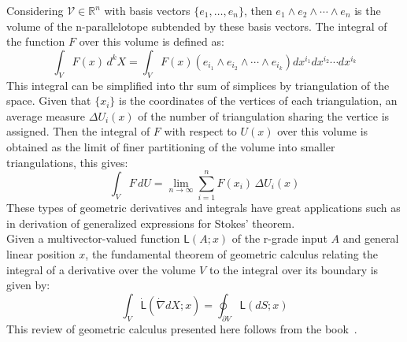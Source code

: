 \documentclass[12pt,onecolumn,letterpaper]{article} %
\begin{document}
Considering $\mathcal{V}\in \mathbb{R}^n$ with basis vectors $\{e_{1},\ldots ,e_{n}\}$, then $e_{1}\wedge e_{2}\wedge \cdots \wedge e_{n}$ is the volume of the n-parallelotope subtended by these basis vectors. The integral of the function $F$ over this volume is defined as:
$$ \int _{V}F(x)\,d^{k}X=\int _{V}F(x)\left(e_{i_{1}}\wedge e_{i_{2}}\wedge \cdots \wedge e_{i_{k}}\right)dx^{i_{1}}dx^{i_{2}}\cdots dx^{i_{k}}$$
This integral can be simplified into thr sum of simplices by triangulation of the space. Given that $\{x_{i}\}$ is the coordinates of the vertices of each triangulation, an average measure $\Delta U_{i}(x)$ of the number of triangulation sharing the vertice is assigned. Then the integral of $F$ with respect to $U(x)$ over this volume is obtained as the limit of finer partitioning of the volume into smaller triangulations, this gives:
$$\int _{V}F\,dU=\lim _{n\rightarrow \infty }\sum _{i=1}^{n}F(x_{i})\,\Delta U_{i}(x)$$
These types of geometric derivatives and integrals have great applications such as in derivation of  generalized expressions for Stokes' theorem.\\
Given a multivector-valued function $\mathsf {L}(A;x)$  of the r-grade input $A$ and general linear position $x$, the fundamental theorem of geometric calculus relating  the integral of a derivative over the volume $V$ to the integral over its boundary is given by:
$$\int _{V}{\dot {\mathsf {L}}}\left({\dot {\nabla }}dX;x\right)=\oint _{\partial V}{\mathsf {L}}(dS;x)$$
This review of geometric calculus presented here follows from the book~\cite{hestenes2012clifford}.
\end{document}
